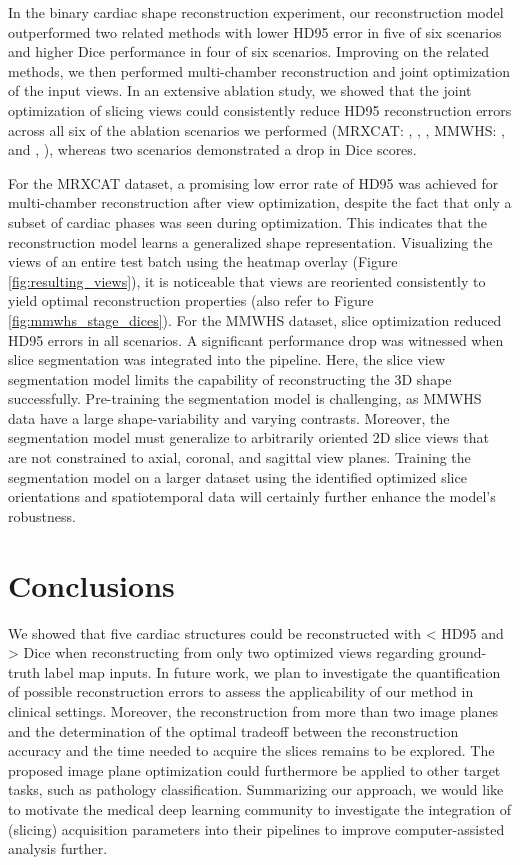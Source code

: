    In the binary cardiac shape reconstruction experiment, our reconstruction model outperformed two related methods with lower HD95 error in five of six scenarios and higher Dice performance in four of six scenarios. Improving on the related methods, we then performed multi-chamber reconstruction and joint optimization of the input views. In an extensive ablation study, we showed that the joint optimization of slicing views could consistently reduce HD95 reconstruction errors across all six of the ablation scenarios we performed (MRXCAT: , , , MMWHS: , and , ), whereas two scenarios demonstrated a drop in Dice scores.

    For the MRXCAT dataset, a promising low error rate of  HD95 was achieved for multi-chamber reconstruction after view optimization, despite the fact that only a subset of cardiac phases was seen during optimization.
    This indicates that the reconstruction model learns a generalized shape representation. Visualizing the views of an entire test batch using the heatmap overlay (Figure\,\ref{fig:resulting_views}), it is noticeable that views are reoriented consistently to yield optimal reconstruction properties (also refer to Figure\,\ref{fig:mmwhs_stage_dices}).
    For the MMWHS dataset, slice optimization reduced HD95 errors in all scenarios.
    A significant performance drop was witnessed when slice segmentation was integrated into the pipeline. Here, the slice view segmentation model limits the capability of reconstructing the 3D shape successfully. Pre-training the segmentation model is challenging, as MMWHS data have a large shape-variability and varying contrasts. Moreover, the segmentation model must generalize to arbitrarily oriented 2D slice views that are not constrained to axial, coronal, and sagittal view planes.
    Training the segmentation model on a larger dataset using the identified optimized slice orientations and spatiotemporal data will certainly further enhance the model's robustness.

\section{Conclusions}
     We showed that five cardiac structures could be reconstructed with < HD95 and > Dice when reconstructing from only two optimized views regarding ground-truth label map inputs.
    In future work, we plan to investigate the quantification of possible reconstruction errors to assess the applicability of our method in clinical settings.
    Moreover, the reconstruction from more than two image planes and the determination of the optimal tradeoff between the reconstruction accuracy and the time needed to acquire the slices remains to be explored.
    The proposed image plane optimization could furthermore be applied to other target tasks, such as pathology classification.
    Summarizing our approach, we would like to motivate the medical deep learning community to investigate the integration of (slicing) acquisition parameters into their pipelines to improve computer-assisted analysis further.
